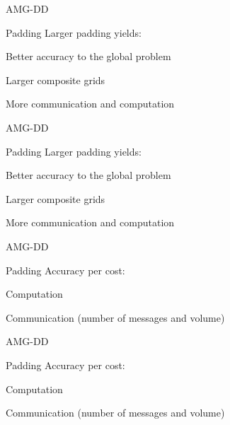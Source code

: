 \documentclass[18pt,xcolor=table]{beamer}
\begin{document}
\begin{frame}{AMG-DD}
\begin{block}{Padding}
Larger padding yields:
\bit
  \item Better accuracy to the global problem
  \item Larger composite grids
  \item More communication and computation
\eit
\end{block}
\centering
\vspace{0.5 cm}
\end{frame}

\begin{frame}{AMG-DD}
\begin{block}{Padding}
Larger padding yields:
\bit
  \item Better accuracy to the global problem
  \item Larger composite grids
  \item More communication and computation
\eit
\end{block}

\centering
\vspace{0.5 cm}

\end{frame}

\begin{frame}{AMG-DD}
\begin{block}{Padding}
Accuracy per cost:
\bit
   \item Computation
   \item Communication (number of messages and volume)
\eit
\end{block}
\centering
\vspace{0.5 cm}
\end{frame}

\begin{frame}{AMG-DD}
\begin{block}{Padding}
Accuracy per cost:
\bit
   \item Computation
   \item Communication (number of messages and volume)
\eit
\end{block}
\centering
\vspace{0.5 cm}
\end{frame}
\end{document}
